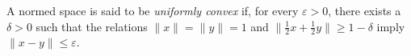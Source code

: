A normed space is said to be \textit{uniformly convex} if, for every $\varepsilon > 0$, there exists a $\delta > 0$ such that the relations $\|x\| = \|y\| = 1$ and $\|\tfrac{1}{2}x + \tfrac{1}{2}y\| \geq 1 - \delta$ imply $\|x - y\| \leq \varepsilon$.
